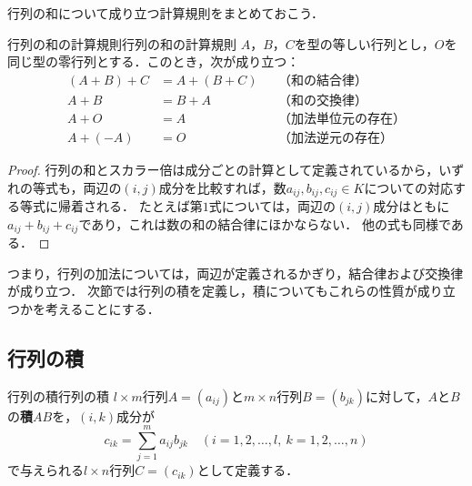 行列の和について成り立つ計算規則をまとめておこう．

\begin{prop}{行列の和の計算規則}{行列の和の計算規則}
  $A$，$B$，$C$を型の等しい行列とし，$O$を同じ型の零行列とする．このとき，次が成り立つ：
  \begin{align*}
    (A + B) + C &= A + (B + C) && \text{（和の結合律）} \\
    A + B &= B + A && \text{（和の交換律）} \\
    A + O &= A && \text{（加法単位元の存在）} \\
    A + (-A) &= O && \text{（加法逆元の存在）}
  \end{align*}
\end{prop}

\begin{leftbar}
\begin{proof}
  行列の和とスカラー倍は成分ごとの計算として定義されているから，いずれの等式も，両辺の$(i, j)$成分を比較すれば，数$a_{ij}, b_{ij}, c_{ij} \in K$についての対応する等式に帰着される．
  たとえば第$1$式については，両辺の$(i, j)$成分はともに$a_{ij} + b_{ij} + c_{ij}$であり，これは数の和の結合律にほかならない．
  他の式も同様である．
\end{proof}
\end{leftbar}

つまり，行列の加法については，両辺が定義されるかぎり，結合律および交換律が成り立つ．
次節では行列の積を定義し，積についてもこれらの性質が成り立つかを考えることにする．

\subsection{行列の積}

\begin{definition}{行列の積}{行列の積}
  $l \times m$行列$A = (a_{ij})$と$m \times n$行列$B = (b_{jk})$に対して，$A$と$B$の\textbf{積}$AB$を，$(i, k)$成分が
  \[
    c_{ik} = \sum_{j=1}^{m} a_{ij} b_{jk}
    \quad (i = 1, 2, \dots, l,~ k = 1, 2, \dots, n)
  \]
  で与えられる$l \times n$行列$C = (c_{ik})$として定義する．
\end{definition}


